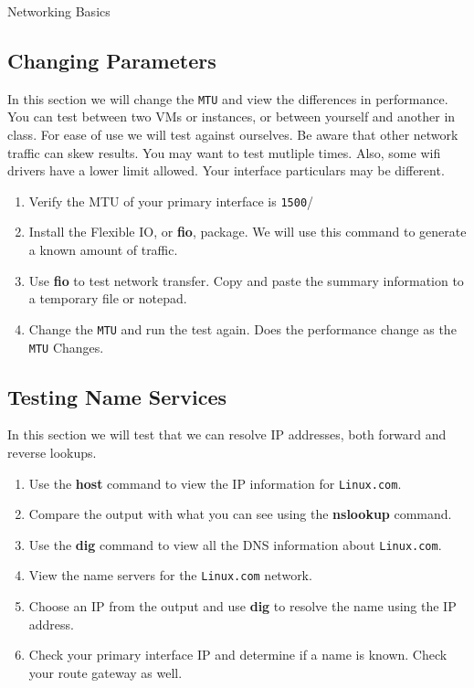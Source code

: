 \begin{Lab}
\begin{exe} {Networking Basics}
\begin{enumerate}
      \end{enumerate}

	\subsection*{Changing Parameters}
   In this section we will change the \verb:MTU: and view
	the differences in performance. You can test between 
	two VMs or instances, or between yourself and another
	in class. For ease of use we will test against ourselves.
	Be aware that other network traffic can
	skew results. You may want to test mutliple times.
	Also, some wifi drivers have a lower limit allowed. Your
	interface particulars may be different. 
	\begin{enumerate}
		\item Verify the MTU of your primary interface 
			is \verb:1500:/
		\item Install the Flexible IO, or \textbf{fio}, package.
			We will use this command to generate a 
			known amount of traffic. 
		\item
			Use \textbf{fio} to test network transfer. 
			Copy and paste the summary information to 
			a temporary file or notepad. 
		\item
			Change the \verb:MTU: and run the test again.
			Does the performance change as the \verb:MTU:
			Changes.
	\end{enumerate}

\subsection*{Testing Name Services}
    In this section we will test that we can resolve
    IP addresses, both forward and reverse lookups.
	        \begin{enumerate}
                \item 
			Use the \textbf{host} command to
				view the IP information for
				\verb:Linux.com:.
			\item
				Compare the output with what
				you can see using the \textbf{nslookup} 
				command.
			\item
				Use the \textbf{dig} command to view
				all the DNS information about
				\verb:Linux.com:. 
			\item
				View the name servers for the \verb:Linux.com:
				network.
			\item
				Choose an IP from the output and use 
				\textbf{dig} to resolve the name using the
				IP address.
			\item
				Check your primary interface IP and determine
				if a name is known. Check your route gateway
				as well.
        \end{enumerate}




\end{exe}
\end{Lab}
